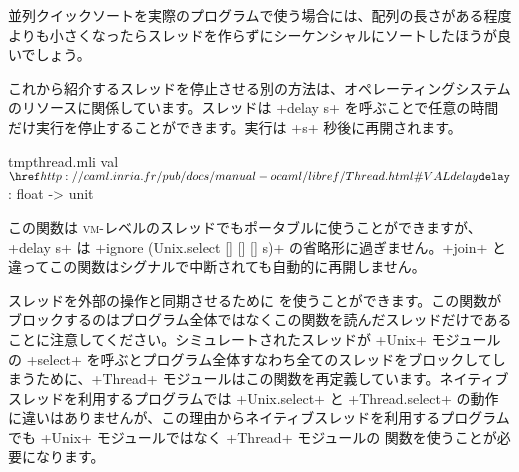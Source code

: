 \begin{answer}
並列クイックソートを実際のプログラムで使う場合には、配列の長さがある程度よりも小さくなったらスレッドを作らずにシーケンシャルにソートしたほうが良いでしょう。
\end{answer}

これから紹介するスレッドを停止させる別の方法は、オペレーティングシステムのリソースに関係しています。スレッドは \ml+delay s+ を呼ぶことで任意の時間だけ実行を停止することができます。実行は \ml+s+ 秒後に再開されます。
%
\begin{listingcodefile}{tmpthread.mli}
val $\indexlibvalue{Thread}{delay}$ : float -> unit
\end{listingcodefile}
%
この関数は \textsc{vm}-レベルのスレッドでもポータブルに使うことができますが、\ml+delay s+ は \ml+ignore (Unix.select [] [] [] s)+ の省略形に過ぎません。\ml+join+ と違ってこの関数はシグナルで中断されても自動的に再開しません。


スレッドを外部の操作と同期させるために  を使うことができます。この関数がブロックするのはプログラム全体ではなくこの関数を読んだスレッドだけであることに注意してください。シミュレートされたスレッドが \ml+Unix+ モジュールの \ml+select+ を呼ぶとプログラム全体すなわち全てのスレッドをブロックしてしまうために、\ml+Thread+ モジュールはこの関数を再定義しています。ネイティブスレッドを利用するプログラムでは \ml+Unix.select+ と \ml+Thread.select+ の動作に違いはありませんが、この理由からネイティブスレッドを利用するプログラムでも \ml+Unix+ モジュールではなく \ml+Thread+ モジュールの  関数を使うことが必要になります。

